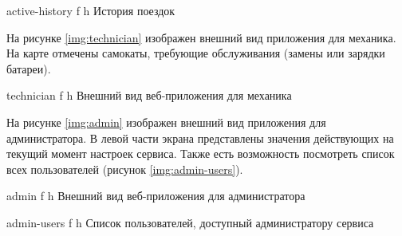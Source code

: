 {active-history}
{f}
{h}
{\textwidth}
{История поездок}

На рисунке \ref{img:technician} изображен внешний вид приложения для механика. На карте отмечены самокаты, требующие обслуживания (замены или зарядки батареи).

{technician}
{f}
{h}
{\textwidth}
{Внешний вид веб-приложения для механика}

На рисунке \ref{img:admin} изображен внешний вид приложения для администратора. В левой части экрана представлены значения действующих на текущий момент настроек сервиса. Также есть возможность посмотреть список всех пользователей (рисунок \ref{img:admin-users}).

{admin}
{f}
{h}
{\textwidth}
{Внешний вид веб-приложения для администратора}

{admin-users}
{f}
{h}
{\textwidth}
{Список пользователей, доступный администратору сервиса}